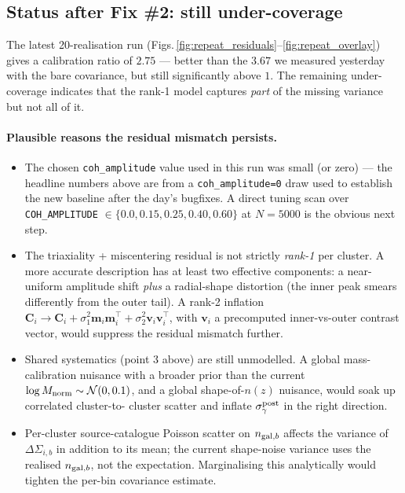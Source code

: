 \documentclass[11pt,a4paper]{article}
\newcommand{\dsig}{\Delta\Sigma}
\begin{document}
\subsection{Status after Fix \#2: still under-coverage}

The latest 20-realisation run (Figs.\,\ref{fig:repeat_residuals}--\ref{fig:repeat_overlay})
gives a calibration ratio of $2.75$ — better than the $3.67$ we measured
yesterday with the bare covariance, but still significantly above $1$.
The remaining under-coverage indicates that the rank-1 model captures
\emph{part} of the missing variance but not all of it.

\paragraph{Plausible reasons the residual mismatch persists.}
\begin{itemize}[noitemsep]
  \item The chosen \texttt{coh\_amplitude} value used in this run was
        small (or zero) — the headline numbers above are from a
        \texttt{coh\_amplitude=0} draw used to establish the new baseline
        after the day's bugfixes.  A direct tuning scan over
        \texttt{COH\_AMPLITUDE} $\in\{0.0, 0.15, 0.25, 0.40, 0.60\}$ at
        $N=5000$ is the obvious next step.
  \item The triaxiality + miscentering residual is not strictly
        \emph{rank-1} per cluster.  A more accurate description has at
        least two effective components: a near-uniform amplitude shift
        \emph{plus} a radial-shape distortion (the inner peak smears
        differently from the outer tail).  A rank-2 inflation
        $\mathbf{C}_i\to\mathbf{C}_i+\sigma_1^2\mathbf{m}_i\mathbf{m}_i^\top
        +\sigma_2^2\mathbf{v}_i\mathbf{v}_i^\top$, with $\mathbf{v}_i$ a
        precomputed inner-vs-outer contrast vector, would suppress the
        residual mismatch further.
  \item Shared systematics (point 3 above) are still unmodelled.  A
        global mass-calibration nuisance with a broader prior than the
        current $\log M_{\rm norm}\sim\mathcal{N}(0,0.1)$, and a global
        shape-of-$n(z)$ nuisance, would soak up correlated cluster-to-
        cluster scatter and inflate $\sigma_\gamma^{\rm post}$ in the
        right direction.
  \item Per-cluster source-catalogue Poisson scatter on $n_{{\rm gal},b}$
        affects the variance of $\dsig_{i,b}$ in addition to its mean;
        the current shape-noise variance uses the realised $n_{{\rm gal},b}$,
        not the expectation.  Marginalising this analytically would tighten
        the per-bin covariance estimate.
\end{itemize}
\end{document}
